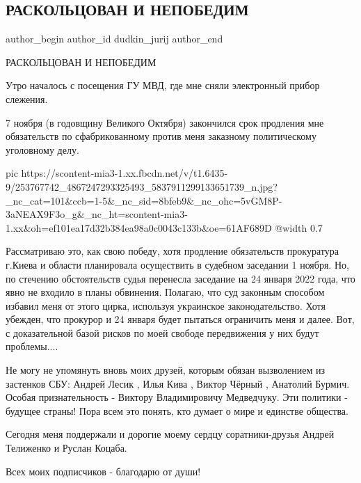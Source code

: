  
 
 
 
 
 
\subsection{РАСКОЛЬЦОВАН И НЕПОБЕДИМ}
\label{sec:07_11_2021.fb.dudkin_jurij.1.blaslet_mvd_snjatie}
 
\ifcmt
 author_begin
   author_id dudkin_jurij
 author_end
\fi

РАСКОЛЬЦОВАН И НЕПОБЕДИМ

Утро началось с посещения ГУ МВД, где мне сняли электронный прибор слежения.

7 ноября (в годовщину Великого Октября) закончился срок продления мне
обязательств по сфабрикованному против меня заказному политическому уголовному
делу.

\ifcmt
  pic https://scontent-mia3-1.xx.fbcdn.net/v/t1.6435-9/253767742_4867247293325493_5837911299133651739_n.jpg?_nc_cat=101&ccb=1-5&_nc_sid=8bfeb9&_nc_ohc=5vGM8P-3aNEAX9F3o_g&_nc_ht=scontent-mia3-1.xx&oh=ef101ea17d32b384ea98a0c0043c133b&oe=61AF689D
  @width 0.7
\fi

Рассматриваю это, как свою победу, хотя продление обязательств прокуратура
г.Киева и области планировала осуществить в судебном заседании 1 ноября. Но, по
стечению обстоятельств судья перенесла заседание на 24 января 2022 года, что
явно не входило в планы обвинения. Полагаю, что суд законным способом избавил
меня от этого цирка, используя украинское законодательство. Хотя убежден, что
прокурор и 24 января будет пытаться ограничить меня и далее. Вот, с
доказательной базой рисков по моей свободе передвижения у них будут
проблемы....

Не могу не упомянуть вновь моих друзей, которым обязан вызволением из застенков
СБУ: Андрей Лесик , Илья Кива , Виктор Чёрный , Анатолий Бурмич. Особая
признательность - Виктору Владимировичу Медведчуку. Эти политики - будущее
страны! Пора всем это понять, кто думает о мире и единстве общества.

Сегодня меня поддержали и дорогие моему сердцу соратники-друзья Андрей
Телиженко и Руслан Коцаба.

Всех моих подписчиков - благодарю от души!
